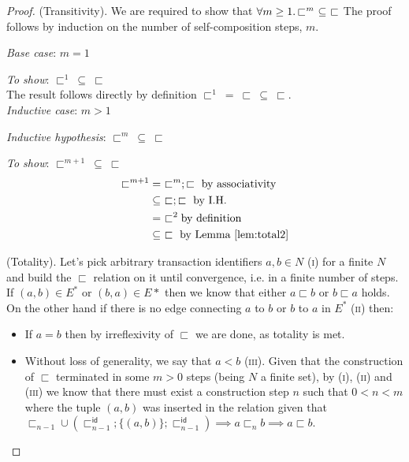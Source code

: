 \begin{thm}
\begin{proof}
	(Transitivity). We are required to show that $\forall m \geq 1 \ldotp \sqsubset^m\ \subseteq\ \sqsubset$ The proof follows by induction on the number of self-composition steps, $m$.
	
	{\parindent0pt
	\textit{Base case}: $m = 1$
	
	\textit{To show}: $\sqsubset^1\ \subseteq\ \sqsubset$ \\
	
	The result follows directly by definition $\sqsubset^1\ =\ \sqsubset\ \subseteq\ \sqsubset$. \\
	
	\textit{Inductive case}: $m > 1$
	
	\textit{Inductive hypothesis}: $\sqsubset^m\ \subseteq\ \sqsubset$
	
	\textit{To show}: $\sqsubset^{m + 1}\ \subseteq\ \sqsubset$
	\begin{align*}
		\sqsubset^{m + 1}
		&=\ \sqsubset^m ; \sqsubset \text{ by associativity} \\
		&\subseteq\ \sqsubset ; \sqsubset \text{ by I.H.} \\
		&=\ \sqsubset^2 \text{by definition} \\
		&\subseteq\ \sqsubset \text{ by Lemma \ref{lem:total2}}
	\end{align*}
	}
	
	(Totality). Let's pick arbitrary transaction identifiers $a, b \in N$ (\textsc{i}) for a finite $N$ and build the $\sqsubset$ relation on it until convergence, i.e. in a finite number of steps. If $(a, b) \in E^*$ or $(b, a) \in E*$ then we know that either $a \sqsubset b$ or $b \sqsubset a$ holds. On the other hand if there is no edge connecting $a$ to $b$ or $b$ to $a$ in $E^*$ (\textsc{ii}) then:
	\begin{itemize}
		\item If $a = b$ then by irreflexivity of $\sqsubset$ we are done, as totality is met.
		\item Without loss of generality, we say that $a < b$ (\textsc{iii}). Given that the construction of $\sqsubset$ terminated in some $m > 0$ steps (being $N$ a finite set), by (\textsc{i}), (\textsc{ii}) and (\textsc{iii}) we know that there must exist a construction step $n$ such that $0 < n < m$ where the tuple $(a, b)$ was inserted in the relation given that $\sqsubset_{n-1} \cup \left( \sqsubset_{n-1}^\mathsf{id} ; \{(a,b)\} ; \sqsubset_{n-1}^\mathsf{id} \right) \implies a \sqsubset_n b \implies a \sqsubset b$. 
	\end{itemize}
	\end{proof}
\end{thm}
	
